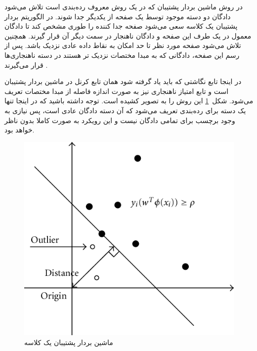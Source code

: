 \documentclass[12pt,a4paper]{report}
\theoremstyle{definition}
\theoremstyle{definition}
\begin{document}
در روش ماشین بردار پشتیبان که در یک روش معروف رده‌بندی است تلاش می‌شود دادگان دو دسته موجود توسط یک صفحه از یکدیگر جدا شوند. در الگوریتم بردار پشتیبان یک کلاسه سعی می‌شود صفحه جدا کننده را طوری مشخص کند تا دادگان معمول در یک طرف این صفحه و دادگان ناهنجار در سمت دیگر آن قرار گیرند. همچنین تلاش می‌شود صفحه مورد نظر تا حد امکان به نقاط داده عادی نزدیک باشد. پس از رسم این صفحه، دادگانی که به مبدا مختصات نزدیک تر هستند در دسته ناهنجاری‌ها قرار می‌گیرند \cite{10.5555/3009657.3009740}.

در اینجا تابع نگاشتی که باید یاد گرفته شود همان تابع کرنل در ماشین بردار پشتیبان است و تابع امتیاز ناهنجاری نیز به صورت اندازه فاصله از مبدا مختصات تعریف می‌شود. شکل~\ref{fig:one-class-svm} این روش را به تصویر کشیده است. توجه داشته باشید که در اینجا تنها یک دسته برای رده‌بندی تعریف می‌شود که آن دسته دادگان عادی است، پس نیازی به وجود برچسب برای تمامی دادگان نیست و این رویکرد به صورت کاملا بدون ناظر خواهد بود.
\begin{figure}[!h]
	\begin{center}
		\includegraphics[width=0.5\linewidth]{./images/figures/one-class-svm.png}
	\end{center}
	\caption{ماشین بردار پشتیبان یک کلاسه}
	\label{fig:one-class-svm}
	\centering
\end{figure}
\end{document}
